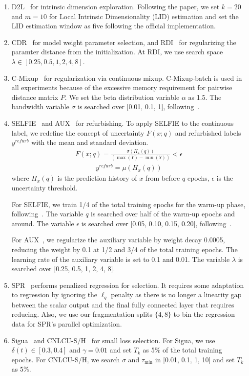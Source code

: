 \documentclass{article}
\theoremstyle{plain}
\theoremstyle{definition}
\theoremstyle{remark}
\begin{document}
\begin{enumerate}
\item D2L~\citep{ma18d2l} for intrinsic dimension exploration. Following the paper, we set $k=20$ and $m=10$ for Local Intrinsic Dimensionality (LID) estimation
and set the LID estimation window as five following the official implementation.
\item CDR~\citep{xia21cdr} for model weight parameter selection, and RDI~\citep{hu20rdiaux} for regularizing the paramter distance from the initialization.
At RDI, we use search space $\lambda \in [0.25, 0.5, 1, 2, 4, 8]$.
\item C-Mixup~\citep{yao22cmixup} for regularization via continuous mixup.
C-Mixup-batch is used in all experiments because of the excessive memory requirement for pairwise distance matrix $P$.
We set the beta distribution variable $\alpha$ as 1.5.
The bandwidth variable $\sigma$ is searched over [0.01, 0.1, 1], following~\citet{yao22cmixup}.
\item SELFIE~\citep{song19b} and AUX~\citep{hu20rdiaux} for refurbishing.
To apply SELFIE to the continuous label, we redefine the concept of uncertainty $F(x;q)$ and
refurbished labels $y^{refurb}$ with the mean and standard deviation.
\begin{align}\label{eq:selfie_uncertainty}
    F(x;q) = \frac{\sigma(H_x(q))}{(\max{(Y)}-\min{(Y)})} < \epsilon
\end{align}
\begin{align}\label{eq:selfie_refurbished_label}
    y^{refurb} = \mu(H_x(q))
\end{align}
where $H_x(q)$ is the prediction history of $x$ from before $q$ epochs, $\epsilon$ is the uncertainty threshold.

For SELFIE, we train 1/4 of the total training epochs for the warm-up phase, following~\citet{song19b}.
The variable $q$ is searched over half of the warm-up epochs and around.
The variable $\epsilon$ is searched over [0.05, 0.10, 0.15, 0.20], following~\citet{song19b}.


For AUX~\citep{hu20rdiaux}, we regularize the auxiliary variable by weight decay 0.0005, reducing the weight by 0.1 at 1/2 and 3/4 of the total training epochs.
The learning rate of the auxiliary variable is set to 0.1 and 0.01.
The variable $\lambda$ is searched over [0.25, 0.5, 1, 2, 4, 8].
\item SPR~\citep{wang22spr} performs penalized regression for selection. It requires some adaptation to regression by ignoring the $\ell_q$
penalty as there is no longer a linearity gap between the scalar output and the final fully connected layer that requires reducing.
Also, we use our fragmentation splits $\{4, 8\}$ to bin the regression data for SPR's parallel optimization.
\item Sigua~\citep{han20sigua} and CNLCU-S/H~\citep{xia22} for small loss selection.
For Sigua, we use $\delta(t)\in[0.3, 0.4]$ and $\gamma=0.01$ and set $T_k$ as 5\% of the total training epochs.
For CNLCU-S/H, we search $\sigma$ and $\tau_{\min}$ in [0.01, 0.1, 1, 10] and set $T_k$ as 5\%.


\end{enumerate}
\end{document}
